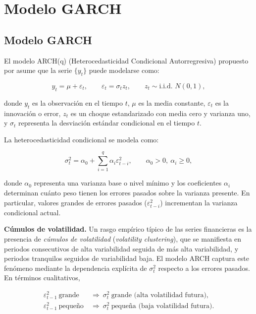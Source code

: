 \documentclass[12pt]{paper}
\begin{document}
\section{Modelo GARCH}
\label{sec:garch}

\subsection[Modelo GARCH]{Modelo GARCH}

El modelo ARCH(q) (Heterocedasticidad Condicional Autorregresiva) propuesto por \cite{engle1982} asume que la serie $\{y_t\}$ puede modelarse como:

\begin{equation}
    y_t = \mu + \varepsilon_t,
    \qquad
    \varepsilon_t = \sigma_t z_t,
    \qquad
    z_t \sim \text{i.i.d. }N(0,1),
\end{equation}

donde $y_t$ es la observación en el tiempo $t$, $\mu$ es la media constante,
$\varepsilon_t$ es la innovación o error, $z_t$ es un choque estandarizado con media cero y varianza uno,
y $\sigma_t$ representa la desviación estándar condicional en el tiempo $t$.

La heterocedasticidad condicional se modela como:

\begin{equation}
    \sigma_t^2 = \alpha_0 + \sum_{i=1}^{q} \alpha_i \varepsilon_{t-i}^2,
    \qquad \alpha_0 > 0,\ \alpha_i \ge 0,
\end{equation}

donde $\alpha_0$ representa una varianza base o nivel mínimo
y los coeficientes $\alpha_i$ determinan cuánto peso tienen los errores pasados
sobre la varianza presente. En particular, valores grandes de errores pasados
($\varepsilon_{t-i}^2$) incrementan la varianza condicional actual.

\vspace{0.3cm}

\noindent\textbf{Cúmulos de volatilidad.}
Un rasgo empírico típico de las series financieras es la presencia de \emph{cúmulos de volatilidad}
(\emph{volatility clustering}), que se manifiesta en periodos consecutivos de alta variabilidad
seguida de más alta variabilidad, y periodos tranquilos seguidos de variabilidad baja.
El modelo ARCH captura este fenómeno mediante la dependencia explícita de $\sigma_t^2$
respecto a los errores pasados. En términos cualitativos,

\begin{equation}
\begin{aligned}
\varepsilon_{t-1}^2 \ \text{grande}
&\ \Rightarrow\
\sigma_t^2 \ \text{grande (alta volatilidad futura)},\\[4pt]
\varepsilon_{t-1}^2 \ \text{pequeño}
&\ \Rightarrow\
\sigma_t^2 \ \text{pequeña (baja volatilidad futura)}.
\end{aligned}
\end{equation}
\end{document}
